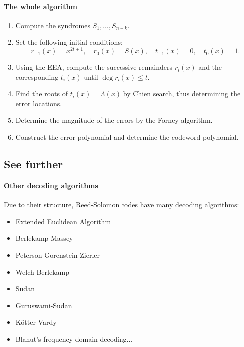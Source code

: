 \documentclass[a4paper, 11pt, openany]{book}
\begin{document}
\paragraph{The whole algorithm}

\begin{enumerate}
	\item Compute the syndromes $S_1, \dots, S_{n-k}$.

	\item Set the following initial conditions:
	$$
		r_{-1}(x) = x^{2t+1}, \quad r_0(x) = S(x), \quad t_{-1}(x) = 0, \quad t_0(x) = 1.
	$$

	\item Using the EEA, compute the successive remainders $r_i(x)$ and the corresponding $t_i(x)$ until $\deg r_i(x) \le t$.

	\item Find the roots of $t_i(x) = \Lambda(x)$ by Chien search, thus determining the error locations.

	\item Determine the magnitude of the errors by the Forney algorithm.

	\item Construct the error polynomial and determine the codeword polynomial.
\end{enumerate}


\subsection{See further}

\paragraph{Other decoding algorithms}
Due to their structure, Reed-Solomon codes have many decoding algorithms:
\begin{itemize}
	\item Extended Euclidean Algorithm

	\item Berlekamp-Massey

	\item Peterson-Gorenstein-Zierler

	\item Welch-Berlekamp

	\item Sudan

	\item Guruswami-Sudan

	\item K\"otter-Vardy

	\item Blahut's frequency-domain decoding...
\end{itemize}
\end{document}
